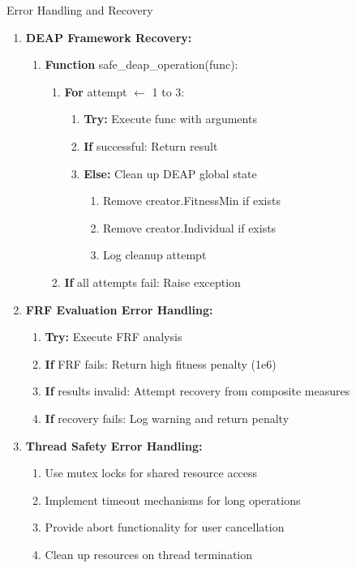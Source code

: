 \documentclass[12pt,a4paper]{article}
\begin{document}
\begin{algorithm}
\caption{Error Handling and Recovery}
\begin{enumerate}
    \item \textbf{DEAP Framework Recovery:}
    \begin{enumerate}
        \item \textbf{Function} safe\_deap\_operation(func):
        \begin{enumerate}
            \item \textbf{For} attempt $\leftarrow$ 1 to 3:
            \begin{enumerate}
                \item \textbf{Try:} Execute func with arguments
                \item \textbf{If} successful: Return result
                \item \textbf{Else:} Clean up DEAP global state
                \begin{enumerate}
                    \item Remove creator.FitnessMin if exists
                    \item Remove creator.Individual if exists
                    \item Log cleanup attempt
                \end{enumerate}
            \end{enumerate}
            \item \textbf{If} all attempts fail: Raise exception
        \end{enumerate}
    \end{enumerate}
    \item \textbf{FRF Evaluation Error Handling:}
    \begin{enumerate}
        \item \textbf{Try:} Execute FRF analysis
        \item \textbf{If} FRF fails: Return high fitness penalty (1e6)
        \item \textbf{If} results invalid: Attempt recovery from composite measures
        \item \textbf{If} recovery fails: Log warning and return penalty
    \end{enumerate}
    \item \textbf{Thread Safety Error Handling:}
    \begin{enumerate}
        \item Use mutex locks for shared resource access
        \item Implement timeout mechanisms for long operations
        \item Provide abort functionality for user cancellation
        \item Clean up resources on thread termination
    \end{enumerate}
\end{enumerate}
\end{algorithm}
\end{document}
